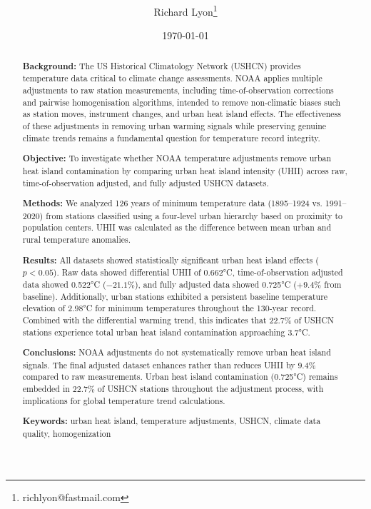 \documentclass[11pt, a4paper]{article}
\title{\bfseries \thetitle} %
\author{Richard Lyon\thanks{richlyon@fastmail.com}}
\date{\today}
\begin{document}
\maketitle
\thispagestyle{empty} %
\begin{abstract}

\noindent\textbf{Background:} The US Historical Climatology Network (USHCN) provides temperature data critical to climate change assessments. NOAA applies multiple adjustments to raw station measurements, including time-of-observation corrections and pairwise homogenisation algorithms, intended to remove non-climatic biases such as station moves, instrument changes, and urban heat island effects. The effectiveness of these adjustments in removing urban warming signals while preserving genuine climate trends remains a fundamental question for temperature record integrity.

\vspace{0.5em}
\noindent\textbf{Objective:} To investigate whether NOAA temperature adjustments remove urban heat island contamination by comparing urban heat island intensity (UHII) across raw, time-of-observation adjusted, and fully adjusted USHCN datasets.

\vspace{0.5em}
\noindent\textbf{Methods:} We analyzed 126 years of minimum temperature data (1895--1924 vs. 1991--2020) from stations classified using a four-level urban hierarchy based on proximity to population centers. UHII was calculated as the difference between mean urban and rural temperature anomalies.

\vspace{0.5em}
\noindent\textbf{Results:} All datasets showed statistically significant urban heat island effects ($p < 0.05$). Raw data showed differential UHII of 0.662°C, time-of-observation adjusted data showed 0.522°C ($-21.1\%$), and fully adjusted data showed 0.725°C ($+9.4\%$ from baseline). Additionally, urban stations exhibited a persistent baseline temperature elevation of 2.98°C for minimum temperatures throughout the 130-year record. Combined with the differential warming trend, this indicates that 22.7\% of USHCN stations experience total urban heat island contamination approaching 3.7°C.

\vspace{0.5em}
\noindent\textbf{Conclusions:} NOAA adjustments do not systematically remove urban heat island signals. The final adjusted dataset enhances rather than reduces UHII by $9.4\%$ compared to raw measurements. Urban heat island contamination (0.725°C) remains embedded in $22.7\%$ of USHCN stations throughout the adjustment process, with implications for global temperature trend calculations.

\vspace{0.5em}
\noindent\textbf{Keywords:} urban heat island, temperature adjustments, USHCN, climate data quality, homogenization

\end{abstract}
\end{document}
